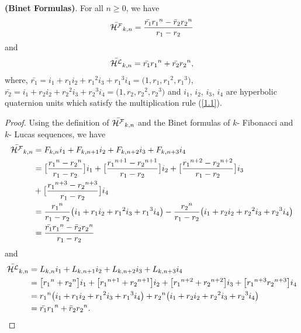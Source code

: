 \begin{theorem}\textbf{(Binet Formulas)}. For all $n\geq{0}$, we have\label{2.3}
\begin{align}\label{2.6} 
\hf_{k,n}= \dfrac{\bar{r_1}{{r_1}}^n-\bar
r_2{r_{2}}^n}{r_1-r_2}
\end{align}
and
\begin{align}\label{2.7} 
\hl_{k,n}= \bar{r_1}{r_{1}}^n +\bar{r_2}{r_{2}}^n,
\end{align}
where, $\bar{r_1}=i_1+r_1i_2+{r_1}^2i_3+{r_1}^3i_4=\big(1, r_1, {r_1}^2, {r_1}^3\big) $, $\bar{r_2}=i_1+r_2i_2+{r_2}^2i_3+{r_2}^3i_4=\big(1, r_2, {r_2}^2, {r_2}^3\big) $ and $i_1$, $i_2$, $i_3$, $i_4$ are hyperbolic quaternion units which satisfy the multiplication rule (\ref{1.1}).
\end{theorem}
\begin{proof}
Using the definition of $\bar{{\mathcal{H^F}}}_{k,n}$ and the Binet formulas of $k$- Fibonacci and $k$- Lucas sequences, we have
\begin{align*}
\bar{{\mathcal{H^F}}}_{k,n}&=F_{k,n}i_1+F_{k,n+1}i_2+F_{k,n+2}i_3+F_{k,n+3}i_4\\
&= \big[\dfrac{{r_1}^n-{r_2}^n}{r_1-r_2}\big]i_1+\big[\dfrac{{r_1}^{n+1}-{r_2}^{n+1}}{r_1-r_2}\big]i_2+\big[\dfrac{{r_1}^{n+2}-{r_2}^{n+2}}{r_1-r_2}\big]i_3\\&+\big[\dfrac{{r_1}^{n+3}-{r_2}^{n+3}}{r_1-r_2}\big]i_4\\
&=\dfrac{{r_1}^n}{r_1-r_2}\big(i_1+r_1i_2+{r_1}^2i_3+{r_1}^3i_4\big)-\dfrac{{r_2}^n}{r_1-r_2}\big(i_1+r_2i_2+{r_2}^2i_3+{r_2}^3i_4\big)\\
&=\dfrac{\bar{r_1}{{r_1}}^n-\bar
r_2{r_{2}}^n}{r_1-r_2}
\end{align*}
and
\begin{align*}
\bar{{\mathcal{H^L}}}_{k,n}&={L_{k,n}}i_1+{L_{k,n+1}}i_2+{L_{k,n+2}}i_3+{L_{k,n+3}}i_4\\
&= \big[{r_1}^n+{r_2}^n\big]i_1+\big[{r_1}^{n+1}+{r_2}^{n+1}\big]i_2+\big[{r_1}^{n+2}+{r_2}^{n+2}\big]i_3+\big[{r_1}^{n+3}{r_2}^{n+3}\big]i_4\\
&={r_1}^n\big(i_1+r_1i_2+{r_1}^2i_3+{r_1}^3i_4\big)+{r_2}^n\big(i_1+r_2i_2+{r_2}^2i_3+{r_2}^3i_4\big)\\
&=\bar{r_1}{{r_1}}^n+\bar
r_2{r_{2}}^n.
\end{align*}
\end{proof}
